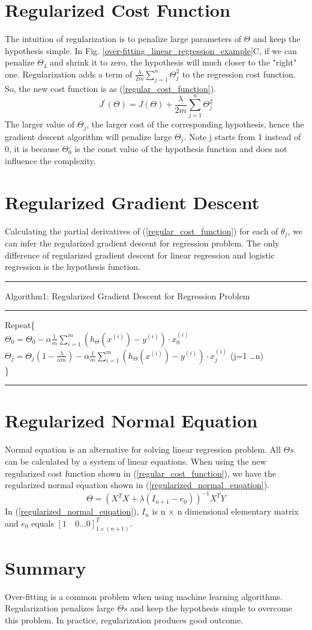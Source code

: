 \documentclass{article}
\begin{document}
\section{Regularized Cost Function}
The intuition of regularization is to penalize large parameters of $\Theta$ and keep the hypothesis simple. In Fig. \ref{over-fitting_linear_regression_example}C, if we can penalize $\Theta_{4}$ and shrink it to zero, the hypothesis will much closer to the "right" one. Regularization adds a term of $\frac{\lambda}{2m} \sum_{j=1}^{n}\Theta_{j}^{2}$ to the regression cost function. So, the new cost function is as (\ref{regular_cost_function}).
\begin{equation}\label{regular_cost_function}
J^{'}(\Theta) = J(\Theta) + \frac{\lambda}{2m} \sum_{j=1}^{n}\Theta_{j}^{2}
\end{equation}
The larger value of $\Theta_{j}$, the larger cost of the corresponding hypothesis, hence the gradient descent algorithm will penalize large $\Theta_{j}$. Note j starts from 1 instead of 0, it is because $\Theta_{0}$ is the const value of the hypothesis function and does not influence the complexity.

\section{Regularized Gradient Descent}
Calculating the partial derivatives of (\ref{regular_cost_function}) for each of $\theta_{j}$, we can infer the regularized gradient descent for regression problem. The only difference of regularized gradient descent for linear regression and logistic regression is the hypothesis function.
\smallskip
\hrule
\smallskip
Algorithm1: Regularized Gradient Descent for Regression Problem
\smallskip
\hrule
\smallskip
Repeat\{\\
$\Theta_0=\Theta_0 - \alpha \frac{1}{m} \sum_{i=1}^{m}(h_\Theta(x^{(i)})-y^{(i)}) \cdot x^{(i)}_{0}$\\
$\Theta_j=\Theta_j(1 - \frac{\lambda}{\alpha m}) - \alpha \frac{1}{m} \sum_{i=1}^{m}(h_\Theta(x^{(i)})-y^{(i)}) \cdot x^{(i)}_{j}$ (j=1 \ldots n)\\
\}\\
\hrule
\section{Regularized Normal Equation}
Normal equation is an alternative for solving linear regression problem. All $\Theta s$ can be calculated by a system of linear equations. When using the new regularized cost function shown in (\ref{regular_cost_function}), we have the regularized normal equation shown in (\ref{regularized_normal_euqation}).
\begin{equation}\label{regularized_normal_euqation}
\Theta = (X^{T}X + \lambda(I_{n+1} - e_{0}))^{-1}X^{T}Y
\end{equation}
In (\ref{regularized_normal_euqation}), $I_{n}$ is n $\times$ n dimensional elementary matrix and $e_{0}$ equals $[1 \quad 0 \ldots 0]_{1 \times (n+1)}^{T}$.

\section{Summary}
Over-fitting is a common problem when using machine learning algorithms. Regularization penalizes large $\Theta s$ and keep the hypothesis simple to overcome this problem. In practice, regularization produces good outcome.
\end{document}
